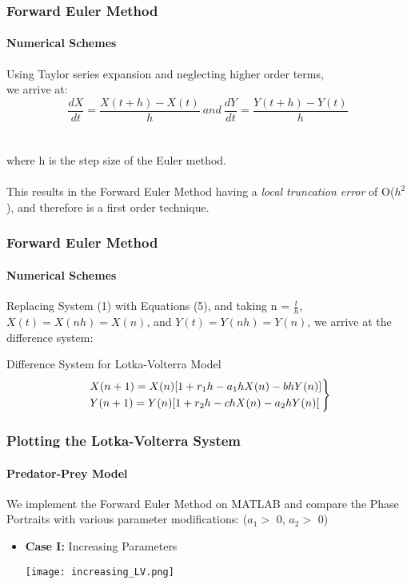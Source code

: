 \documentclass[xcolor={svgnames},hyperref={colorlinks,allcolors=Blue}]{beamer}
\begin{document}
\begin{frame}
\frametitle{Forward Euler Method}
\framesubtitle{Numerical Schemes}

Using Taylor series expansion and neglecting higher order terms, \pause \\ we arrive at: \\
	\begin{equation}
		\frac{dX}{dt} = \frac{X(t+h)-X(t)}{h} ~and~
		\frac{dY}{dt} = \frac{Y(t+h)-Y(t)}{h}
	\end{equation}
	\\~\\ where h is the step size of the Euler method. \\~\\
	\pause
	This results in the Forward Euler Method having a \textit{local truncation error} of O($h^2$), and therefore is a first order technique. 
	
\end{frame}

\begin{frame}
\frametitle{Forward Euler Method}
\framesubtitle{Numerical Schemes}

Replacing System (1) with Equations (5), and taking n = $\frac{t}{h}$, $X(t) = X(nh) =  X(n)$, and $Y(t) = Y(nh) = Y(n)$, we arrive at the difference system:

\pause
\begin{block}{Difference System for Lotka-Volterra Model}
	\begin{equation}
		\begin{rcases}
		~X(n+1) = X(n)[1+r_1h-a_1hX(n)-bhY(n)] \\ 
		~Y(n+1) = Y(n)[1+r_2h-chX(n)-a_2hY(n)[
		\end{rcases}
	\end{equation}
\end{block}

\end{frame}

\begin{frame}
\frametitle{Plotting the Lotka-Volterra System}
\framesubtitle{Predator-Prey Model}
We implement the Forward Euler Method on MATLAB and compare the Phase Portraits with various parameter modifications: ($a_1 >$ 0, $a_2 >$ 0) \\ 
\begin{itemize}
\pause
\item \textbf{Case I:} Increasing Parameters
	\begin{center}
		\texttt{[image: increasing\_LV.png]}
	\end{center}

\end{itemize}
\end{frame}
\end{document}
